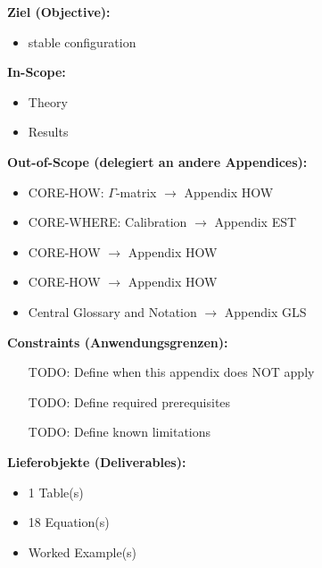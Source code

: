 %
%
%
%
%


\begin{tcolorbox}[
    colback=orange!5!white,
    colframe=orange!75!black,
    title={\textbf{Appendix Scope: Ziel / In-Scope / Out-of-Scope / Constraints}},
    fonttitle=\bfseries
]

\textbf{Ziel (Objective):}
\begin{itemize}[nosep]
    \item stable configuration
\end{itemize}

\textbf{In-Scope:}
\begin{itemize}[nosep]
    \item Theory
    \item Results
\end{itemize}

\textbf{Out-of-Scope (delegiert an andere Appendices):}
\begin{itemize}[nosep]
    \item CORE-HOW: $\Gamma$-matrix $\rightarrow$ Appendix HOW
    \item CORE-WHERE: Calibration $\rightarrow$ Appendix EST
    \item CORE-HOW $\rightarrow$ Appendix HOW
    \item CORE-HOW $\rightarrow$ Appendix HOW
    \item Central Glossary and Notation $\rightarrow$ Appendix GLS
\end{itemize}

\textbf{Constraints (Anwendungsgrenzen):}
\begin{itemize}[nosep]
    \item [TODO: Define when this appendix does NOT apply]
    \item [TODO: Define required prerequisites]
    \item [TODO: Define known limitations]
\end{itemize}

\textbf{Lieferobjekte (Deliverables):}
\begin{itemize}[nosep]
    \item 1 Table(s)
    \item 18 Equation(s)
    \item Worked Example(s)
\end{itemize}

\end{tcolorbox}


